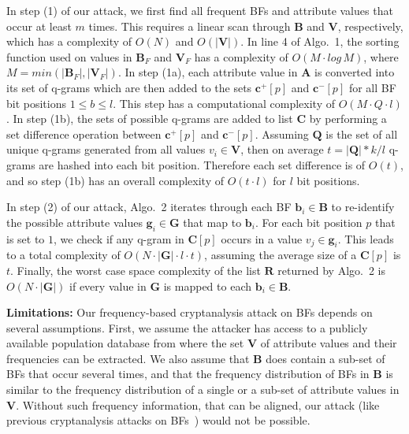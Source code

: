 \documentclass{llncs}
\begin{document}
In step (1) of our attack, we first find all frequent BFs and
attribute values that occur at least $m$ times. This requires a
linear scan through $\mathbf{B}$ and $\textbf{V}$, respectively,
which has a complexity of $O(N)$ and $O(|\textbf{V}|)$. In line 4 of
Algo.~1, the sorting function used on values in $\textbf{B}_F$ and
$\textbf{V}_F$ has a complexity of $O(M \cdot log\,M)$, where $M =
min(|\textbf{B}_F|, |\textbf{V}_F|)$.
%
In step (1a), each attribute value in $\textbf{A}$ is converted into
its set of q-grams which are then added to the sets $\mathbf{c}^+[p]$
and $\mathbf{c}^-[p]$ for all BF bit positions $1 \le b \le l$. This
step has a computational complexity of $O(M \cdot Q \cdot l)$. In
step (1b), the sets of possible q-grams are added to list
$\mathbf{C}$ by performing a set difference operation between
$\mathbf{c}^+[p]$ and $\mathbf{c}^-[p]$. Assuming $\mathbf{Q}$ is
the set of all unique q-grams generated from all values $v_i \in
\mathbf{V}$, then on average $t=|\mathbf{Q}|*k/l$ q-grams are hashed
into each bit position. Therefore each set difference is of $O(t)$,
and so step (1b) has an overall complexity of $O(t \cdot l)$ for $l$
bit positions.

In step (2) of our attack, Algo.~2 iterates through each BF
$\mathbf{b}_i \in \mathbf{B}$ to re-identify the possible attribute
values $\mathbf{g}_i \in \mathbf{G}$ that map to $\mathbf{b}_i$. For
each bit position $p$ that is set to $1$, we check if any q-gram in
$\mathbf{C}[p]$ occurs in a value $v_j \in \mathbf{g}_i$. This leads
to a total complexity of $O(N \cdot |\mathbf{G}| \cdot l \cdot t)$,
assuming the average size of a $\mathbf{C}[p]$ is $t$. Finally, the
worst case space complexity of the list $\mathbf{R}$ returned by
Algo.~2 is $O(N \cdot |\mathbf{G}|)$ if every value in $\mathbf{G}$
is mapped to each $\mathbf{b}_i \in \mathbf{B}$.
 
\smallskip

\textbf{Limitations:} Our frequency-based cryptanalysis attack on
BFs depends on several assumptions. First, we assume the attacker
has access to a publicly available population database from where
the set $\mathbf{V}$ of attribute values and their frequencies can
be extracted. We also assume that $\mathbf{B}$ does contain a sub-set
of BFs that occur several times, and that the frequency distribution
of BFs in $\mathbf{B}$ is similar to the frequency
distribution of a single or a sub-set of attribute values in
$\mathbf{V}$. Without such frequency information, that can be
aligned, our attack (like previous cryptanalysis attacks on
BFs~\cite{Kro15,Kuz11,Kuz13,Nie14}) would not be possible.
\end{document}
